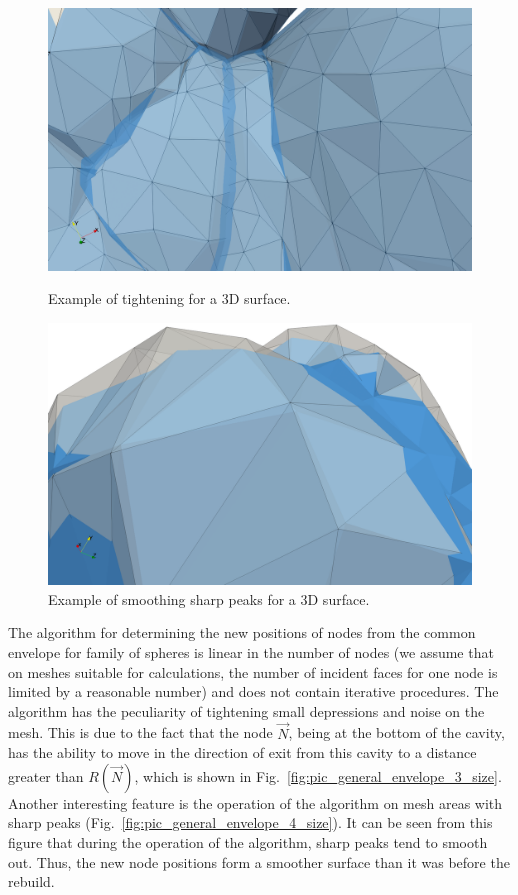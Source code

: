 \documentclass[
11pt,
tightenlines,
twoside,
onecolumn,
nofloats,
nobibnotes,
nofootinbib,
superscriptaddress,
noshowpacs,
centertags]
{revtex4}
\begin{document}
\begin{figure}[h]
  \centering
  \begin{minipage}[h]{0.49\textwidth}
    \includegraphics[width=\textwidth]{pics/pic_envelope_cave.png}
    \caption{Example of tightening for a 3D surface.}\label{fig:pic_general_envelope_cave}
  \end{minipage}
  \hfill
  \begin{minipage}[h]{0.49\textwidth}
    \includegraphics[width=\textwidth]{pics/pic_envelope_peak.png}
    \caption{Example of smoothing sharp peaks for a 3D surface.}\label{fig:pic_envelope_peak}
  \end{minipage}
\end{figure}

The algorithm for determining the new positions of nodes from the common envelope for family of spheres is linear in the number of nodes (we assume that on meshes suitable for calculations, the number of incident faces for one node is limited by a reasonable number) and does not contain iterative procedures.
The algorithm has the peculiarity of tightening small depressions and noise on the mesh.
This is due to the fact that the node $\vec{N}$, being at the bottom of the cavity, has the ability to move in the direction of exit from this cavity to a distance greater than $R(\vec{N})$, which is shown in Fig.~\ref{fig:pic_general_envelope_3_size}.
Another interesting feature is the operation of the algorithm on mesh areas with sharp peaks (Fig.~\ref{fig:pic_general_envelope_4_size}).
It can be seen from this figure that during the operation of the algorithm, sharp peaks tend to smooth out.
Thus, the new node positions form a smoother surface than it was before the rebuild.
\end{document}
